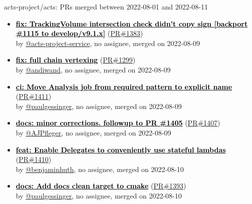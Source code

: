 \begin{frame}[allowframebreaks]{ acts-project/acts: PRs merged 
between 2022-08-01 and 2022-08-11
}
\begin{itemize}
    \item\prmerged
    \hspace*{0.1em}
    \textbf{\href{https://github.com/acts-project/acts/pull/1383}{\textcolor{black}{fix: TrackingVolume intersection check didn't copy sign [backport \#1115 to develop/v9.1.x]}}}
    (\href{https://github.com/acts-project/acts/pull/1383}{PR\#1383}) \\
    by \href{https://github.com/acts-project-service}{@acts-project-service}, {}no assignee, merged on 2022-08-09

    \item\prmerged
    \hspace*{0.1em}
    \textbf{\href{https://github.com/acts-project/acts/pull/1299}{\textcolor{black}{fix: full chain vertexing}}}
    (\href{https://github.com/acts-project/acts/pull/1299}{PR\#1299}) \\
    by \href{https://github.com/andiwand}{@andiwand}, {}no assignee, merged on 2022-08-09

    \item\prmerged
    \hspace*{0.1em}
    \textbf{\href{https://github.com/acts-project/acts/pull/1411}{\textcolor{black}{ci: Move Analysis job from required pattern to explicit name}}}
    (\href{https://github.com/acts-project/acts/pull/1411}{PR\#1411}) \\
    by \href{https://github.com/paulgessinger}{@paulgessinger}, {}no assignee, merged on 2022-08-09

    \item\prmerged
    \hspace*{0.1em}
    \textbf{\href{https://github.com/acts-project/acts/pull/1407}{\textcolor{black}{docs: minor corrections. followup to PR \#1405}}}
    (\href{https://github.com/acts-project/acts/pull/1407}{PR\#1407}) \\
    by \href{https://github.com/AJPfleger}{@AJPfleger}, {}no assignee, merged on 2022-08-09

    \item\prmerged
    \hspace*{0.1em}
    \textbf{\href{https://github.com/acts-project/acts/pull/1410}{\textcolor{black}{feat: Enable Delegates to conveniently use stateful lambdas}}}
    (\href{https://github.com/acts-project/acts/pull/1410}{PR\#1410}) \\
    by \href{https://github.com/benjaminhuth}{@benjaminhuth}, {}no assignee, merged on 2022-08-10

    \item\prmerged
    \hspace*{0.1em}
    \textbf{\href{https://github.com/acts-project/acts/pull/1393}{\textcolor{black}{docs: Add docs clean target to cmake}}}
    (\href{https://github.com/acts-project/acts/pull/1393}{PR\#1393}) \\
    by \href{https://github.com/paulgessinger}{@paulgessinger}, {}no assignee, merged on 2022-08-10


\end{itemize}
\end{frame}
